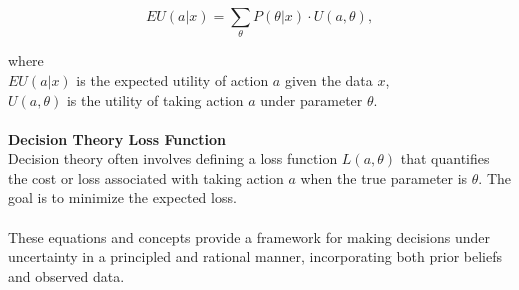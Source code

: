 \documentclass[12pt]{article}
\begin{document}
\begin{equation}
    EU(a | x) = \sum_{\theta} P(\theta | x) \cdot U(a, \theta),
\end{equation}

\noindent where\\
\( EU(a | x) \) is the expected utility of action \( a \) given the data \( x \),\\
\( U(a, \theta) \) is the utility of taking action \( a \) under parameter \( \theta \).\\
\\
\textbf{Decision Theory Loss Function}\\
Decision theory often involves defining a loss function \( L(a, \theta) \) that quantifies
the cost or loss associated with taking action \( a \) when the true parameter
is \( \theta \). The goal is to minimize the expected loss.\\
\\
These equations and concepts provide a framework for making decisions under uncertainty
in a principled and rational manner, incorporating both prior beliefs and observed data.
\end{document}
